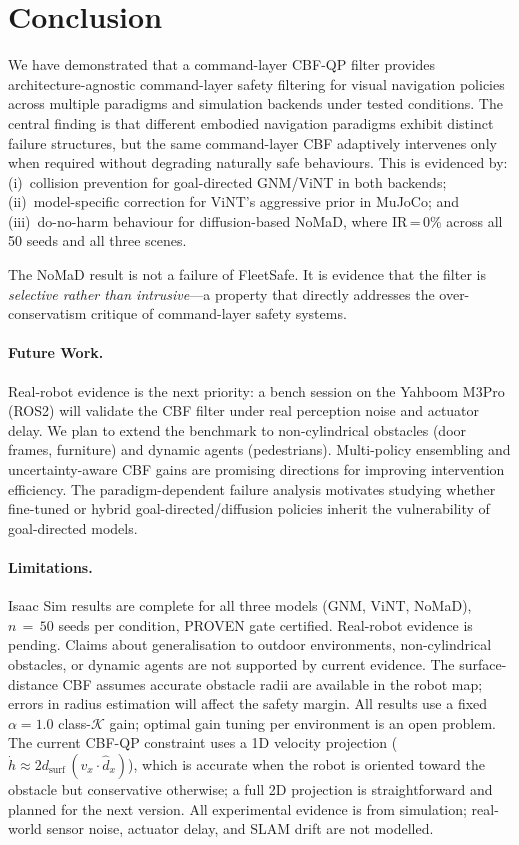 \documentclass[letterpaper]{article}
\begin{document}
\section{Conclusion}
\label{sec:conclusion}

We have demonstrated that a command-layer CBF-QP filter provides
architecture-agnostic command-layer safety filtering for visual navigation
policies across multiple paradigms and simulation backends under tested
conditions. The central finding is that different embodied navigation paradigms
exhibit distinct failure structures, but the same command-layer CBF
adaptively intervenes only when required without degrading naturally safe
behaviours. This is evidenced by: (i)~collision prevention for goal-directed
GNM/ViNT in both backends; (ii)~model-specific correction for ViNT's
aggressive prior in MuJoCo; and (iii)~do-no-harm behaviour for diffusion-based
NoMaD, where IR\,=\,0\% across all 50 seeds and all three scenes.

The NoMaD result is not a failure of FleetSafe. It is evidence that the
filter is \emph{selective rather than intrusive}---a property that directly
addresses the over-conservatism critique of command-layer safety systems.

\paragraph{Future Work.}
Real-robot evidence is the next priority: a bench session on the
Yahboom M3Pro (ROS2) will validate the CBF filter under real perception
noise and actuator delay. We plan to extend the benchmark to non-cylindrical
obstacles (door frames, furniture) and dynamic agents (pedestrians).
Multi-policy ensembling and uncertainty-aware CBF gains are promising
directions for improving intervention efficiency. The paradigm-dependent
failure analysis motivates studying whether fine-tuned or hybrid
goal-directed/diffusion policies inherit the vulnerability of goal-directed
models.

\paragraph{Limitations.}
Isaac Sim results are complete for all three models (GNM, ViNT, NoMaD),
$n\,{=}\,50$ seeds per condition, PROVEN gate certified.
Real-robot evidence is pending. Claims about generalisation to outdoor
environments, non-cylindrical obstacles, or dynamic agents are not supported
by current evidence.
The surface-distance CBF assumes accurate obstacle radii are available
in the robot map; errors in radius estimation will affect the safety margin.
All results use a fixed $\alpha = 1.0$ class-$\mathcal{K}$ gain; optimal
gain tuning per environment is an open problem.
The current CBF-QP constraint uses a 1D velocity projection
($\dot{h} \approx 2d_{\text{surf}}\,(v_x \cdot \hat{d}_x)$), which is
accurate when the robot is oriented toward the obstacle but
conservative otherwise; a full 2D projection is straightforward and
planned for the next version.
All experimental evidence is from simulation; real-world sensor noise,
actuator delay, and SLAM drift are not modelled.
\end{document}
